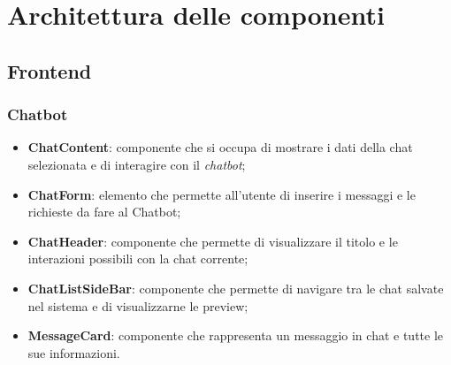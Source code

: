 \documentclass[10pt, a4paper]{article}
\begin{document}
\section{Architettura delle componenti}
\subsection{Frontend}



\subsubsection{Chatbot}
\begin{itemize} 
    \item \label{ChatContent}\textbf{ChatContent}: componente che si occupa di mostrare i dati della chat selezionata e di interagire con il \textit{chatbot\pg};
    \item \label{ChatForm}\textbf{ChatForm}: elemento che permette all'utente di inserire i messaggi e le richieste da fare al Chatbot;
    \item \label{ChatHeader}\textbf{ChatHeader}: componente che permette di visualizzare il titolo e le interazioni possibili con la chat corrente; 
    \item \label{ChatListSideBar}\textbf{ChatListSideBar}: componente che permette di navigare tra le chat salvate nel sistema e di visualizzarne le preview;
    \item \label{MessageCard}\textbf{MessageCard}: componente che rappresenta un messaggio in chat e tutte le sue informazioni.  
\end{itemize}
\end{document}

